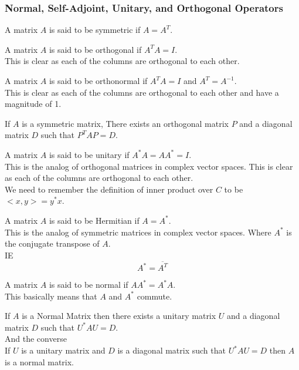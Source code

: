 \documentclass[answers,12pt,addpoints]{exam}
\begin{document}
\subsubsection{Normal, Self-Adjoint, Unitary, and Orthogonal Operators}
\begin{definition}
    A matrix $A$ is said to be symmetric if $A = A^T$.
\end{definition}
\begin{definition}[Orthogonal]
    A matrix $A$ is said to be orthogonal if $A^TA = I$.\\
    This is clear as each of the columns are orthogonal to each other.
\end{definition}
\begin{definition}
    A matrix $A$ is said to be orthonormal if $A^TA = I$ and $A^T = A^{-1}$.\\
    This is clear as each of the columns are orthogonal to each other and have a magnitude of 1.
\end{definition}
\begin{theorem}
    If $A$ is a symmetric matrix, There exists an orthogonal matrix $P$ and a diagonal matrix $D$ such that $P^TAP = D$.
\end{theorem}

\begin{definition}
    A matrix $A$ is said to be unitary if $A^*A = AA^* =I$.\\
    This is the analog of orthogonal matrices in complex vector spaces.
    This is clear as each of the columns are orthogonal to each other.\\
    We need to remember the definition of inner product over $C$ to be $<x,y> = y^*x$.\\
\end{definition}
\begin{definition}
    A matrix $A$ is said to be Hermitian if $A = A^*$.\\
    This is the analog of symmetric matrices in complex vector spaces.
    Where $A^*$ is the conjugate transpose of $A$. \\
    IE $$ A^* = \overline{A^T}$$
\end{definition}
\begin{definition}
    A matrix $A$ is said to be normal if $AA^* = A^*A$.\\
    This basically means that $A$ and $A^*$ commute.
\end{definition}
\begin{theorem}
    If $A$ is a Normal Matrix then there exists a unitary matrix $U$ and a diagonal matrix $D$ such that $U^*AU = D$.\\
    And the converse\\
    If $U$ is a unitary matrix and $D$ is a diagonal matrix such that $U^*AU = D$ then $A$ is a normal matrix.
\end{theorem}
\end{document}
